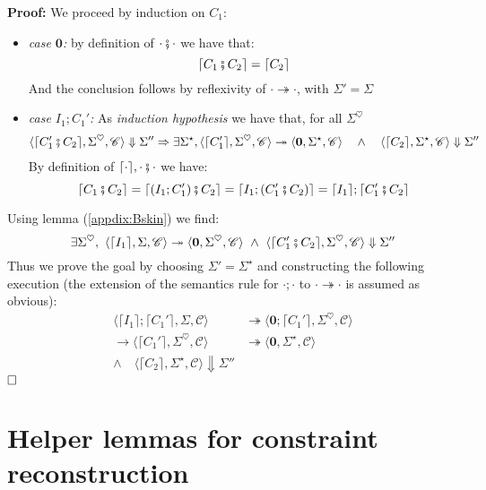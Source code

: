 \documentclass[12pt,a4paper,twoside]{book}
\newcommand{\qed}{\hfill\square}
\newcommand{\heart}{\heartsuit}
\begin{document}
\begin{appendices}
\noindent\textbf{Proof:}
We proceed by induction on $C_1$:
\begin{itemize}
\item \emph{case $\boldsymbol{0}$:} by definition of $\cdot \fatsemi \cdot$ we have that:
$$
\lceil C_1 \fatsemi C_2 \rceil = \lceil C_2 \rceil
$$
And the conclusion follows by reflexivity of $\cdot \twoheadrightarrow \cdot$, with $\Sigma' = \Sigma$
\item \emph{case $I_1; C_1'$:} As \emph{induction hypothesis} we have that, for all $\Sigma^\heart$
\begin{align*}
\begin{split}
\langle \lceil C_1' \fatsemi C_2\rceil, \Sigma^\heart, \mathscr{C}\rangle \Downarrow \Sigma''
\Rightarrow \exists \Sigma^\star,
\langle \lceil C_1' \rceil, \Sigma^\heart, \mathscr{C} \rangle \twoheadrightarrow \langle \boldsymbol{0}, \Sigma^\star, \mathscr{C} \rangle 
\quad\land\quad
\langle \lceil C_2 \rceil, \Sigma^\star, \mathscr{C} \rangle \Downarrow \Sigma''
\end{split}
\end{align*}
By definition of $\lceil \cdot \rceil, \cdot \fatsemi \cdot$ we have:
$$
\lceil C_1 \fatsemi C_2 \rceil = \lceil (I_1; C_1') \fatsemi C_2 \rceil =
\lceil I_1; (C_1' \fatsemi C_2) \rceil = \lceil I_1 \rceil; \lceil C_1' \fatsemi C_2 \rceil
$$
\end{itemize}
Using lemma (\ref{appdix:Bskin}) we find:
$$
\exists \Sigma^\heart,~\langle \lceil I_1 \rceil, \Sigma, \mathscr{C} \rangle \twoheadrightarrow \langle \boldsymbol{0}, \Sigma^\heart, \mathscr{C} \rangle ~\land~ \langle \lceil C_1' \fatsemi C_2 \rceil, \Sigma^\heart, \mathscr{C}\rangle \Downarrow \Sigma''
$$
Thus we prove the goal by choosing $\Sigma' = \Sigma^\star$ and constructing the following execution (the extension of the semantics rule for $\cdot;\cdot$ to $\cdot \twoheadrightarrow \cdot$ is assumed as obvious):
\begin{align*}
\langle \lceil I_1\rceil; \lceil C_1'\rceil, \Sigma, \mathscr{C}\rangle
&\twoheadrightarrow
\langle \boldsymbol{0}; \lceil C_1'\rceil, \Sigma^\heart, \mathscr{C}\rangle\\
\rightarrow \langle \lceil C_1' \rceil, \Sigma^\heart, \mathscr{C}\rangle
&\twoheadrightarrow \langle \boldsymbol{0}, \Sigma^\star, \mathscr{C}\rangle\\
	\land\quad \langle\lceil C_2 \rceil, \Sigma^\star,\mathscr{C}\rangle \Downarrow \Sigma''&
\end{align*}
$\qed$

\chapter{Helper lemmas for constraint reconstruction}

\end{appendices}
\end{document}

